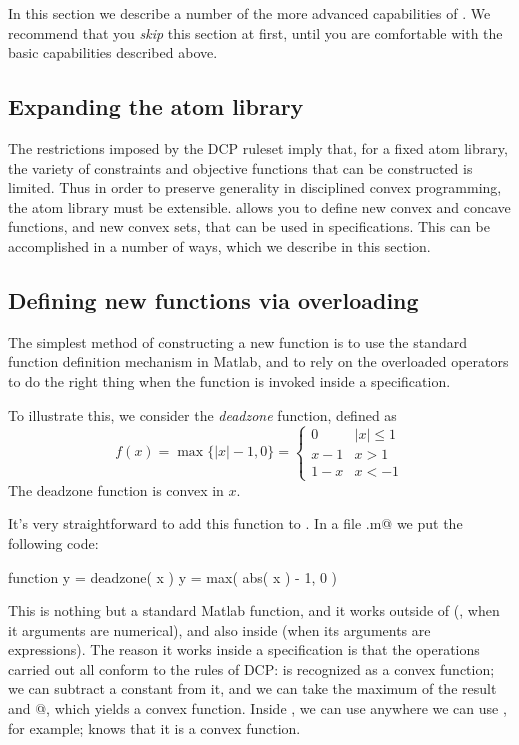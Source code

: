 \documentclass[12pt]{article}
\begin{document}
In this section we describe a number of the more advanced capabilities of \cvx.
We recommend that you \emph{skip} this section at first, until you are comfortable
with the basic capabilities described above.

\subsection{Expanding the \cvx atom library}

The restrictions imposed by the DCP ruleset imply that,
for a fixed atom library, the variety of constraints and objective 
functions that can be constructed is limited.
Thus in order to preserve generality in
disciplined convex programming, the atom library must be extensible.
\cvx allows
you to define new convex and concave functions, and new convex sets, 
that can be used in \cvx specifications. 
This can be accomplished in a number of
ways, which we describe in this section.

\subsection{Defining new functions via overloading}
\label{s-new-fcts}

The simplest method of constructing a new function is to use the 
standard function definition mechanism in Matlab, and to rely on
the overloaded operators to do the right thing when the function is
invoked inside a \cvx specification.

To illustrate this, we consider the \emph{deadzone} function,
defined as
\[
f(x) = \max \{ |x|-1, 0 \} =
\left\{ \begin{array}{ll}
0 & |x| \leq 1\\
x-1 & x > 1\\
1-x & x <-1
\end{array}\right.
\]
The deadzone function is convex in $x$.  

It's very straightforward to add this function to \cvx.   In a file
\verb@deadzone.m@ we put the following code:
\begin{code}
	function y = deadzone( x )
	y = max( abs( x ) - 1, 0 )
\end{code}
This is nothing but a standard Matlab function, and it works
outside of \cvx 
(\ie, when it arguments are numerical), and also inside
\cvx (when its arguments are expressions).
The reason it works inside a \cvx specification is that the operations
carried out all conform to the rules of DCP:
\verb@abs@ is recognized as a convex function; we can subtract 
a constant from it, and we can take the maximum of the result and 
@, which yields a convex function.
Inside \cvx, we can use \verb@deadzone@ anywhere we can
use \verb@norm@, for example; 
\cvx knows that it is a convex function.
\end{document}
